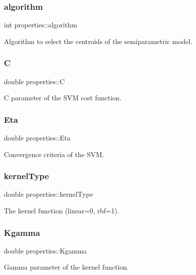 \subsubsection{\texorpdfstring{algorithm}{algorithm}}
{\ttfamily int properties\+::algorithm}

Algorithm to select the centroids of the semiparametric model. \hypertarget{structproperties_a3b98814395b295db30f029e5e67ae9c9}{}\label{structproperties_a3b98814395b295db30f029e5e67ae9c9} 
\subsubsection{\texorpdfstring{C}{C}}
{\ttfamily double properties\+::C}

C parameter of the S\+VM cost function. \hypertarget{structproperties_abd91deb543a31a6a1f75892af7cf95c8}{}\label{structproperties_abd91deb543a31a6a1f75892af7cf95c8} 
\subsubsection{\texorpdfstring{Eta}{Eta}}
{\ttfamily double properties\+::\+Eta}

Convergence criteria of the S\+VM. \hypertarget{structproperties_a498e1588ce31c3265632f17f7d65c624}{}\label{structproperties_a498e1588ce31c3265632f17f7d65c624} 
\subsubsection{\texorpdfstring{kernel\+Type}{kernelType}}
{\ttfamily double properties\+::kernel\+Type}

The kernel function (linear=0, rbf=1). \hypertarget{structproperties_aab9c0195a446f08fc782701750ddb6ac}{}\label{structproperties_aab9c0195a446f08fc782701750ddb6ac} 
\subsubsection{\texorpdfstring{Kgamma}{Kgamma}}
{\ttfamily double properties\+::\+Kgamma}

Gamma parameter of the kernel function. \hypertarget{structproperties_a42219768dd35e1ab628e1785759df400}{}\label{structproperties_a42219768dd35e1ab628e1785759df400} 

